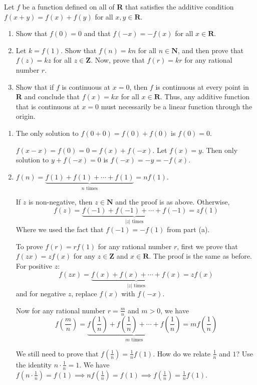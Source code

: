 \documentclass{oxmathproblems}
\begin{document}
\begin{questions}
\miquestion Let $f$ be a function defined on all of \textbf{R} that satisfies the additive condition $f(x+y) = f(x)+f(y)$ for all $x, y \in \textbf{R}$.
\begin{enumerate}[label=(\alph*)]
  \item Show that $f(0)=0$ and that $f(-x)=-f(x)$ for all $x \in \textbf{R}$.
  \item Let $k=f(1)$. Show that $f(n)=kn$ for all $n \in \textbf{N}$, and then prove that $f(z)=kz$ for all $z \in \textbf{Z}$. Now, prove that $f(r)=kr$ for any
  rational number $r$.
  \item Show that if $f$ is continuous at $x=0$, then $f$ is continuous at every point in \textbf{R} and conclude that $f(x)=kx$ for all $x \in \textbf{R}$. Thus,
  any additive function that is continuous at $x=0$ must necessarily be a linear function through the origin.
\end{enumerate}

\begin{solution}
  \begin{enumerate}[label=(\alph*)]
    \item The only solution to $f(0+0)=f(0)+f(0)$ is $f(0)=0$.
    
    $f(x-x)=f(0)=0=f(x)+f(-x)$. Let $f(x)=y$. Then only solution to $y+f(-x)=0$ is $f(-x)=-y=-f(x)$.

    \item $f(n) = \underbrace{f(1)+f(1)+ \cdots + f(1)}_{n \text{ times}} = nf(1)$.
    
    If $z$ is non-negative, then $z \in \textbf{N}$ and the proof is as above. Otherwise,
    \[f(z) = \underbrace{f(-1)+f(-1)+\cdots+f(-1)}_{|z| \text{ times}}=zf(1)\]
    Where we used the fact that $f(-1)=-f(1)$ from part (a).

    To prove $f(r) = rf(1)$ for any rational number $r$, first we prove that $f(zx)=zf(x)$ for any $z \in \textbf{Z}$ and $x \in \textbf{R}$. The proof is the same as before.
    For positive $z$:
    \[f(zx) = \underbrace{f(x)+f(x)+\cdots+f(x)}_{|z| \text{ times}}=zf(x)\]
    and for negative $z$, replace $f(x)$ with $f(-x)$.

    Now for any rational number $r=\frac{m}{n}$ and $m > 0$, we have
    \[f(\frac{m}{n}) = \underbrace{f(\frac{1}{n})+f(\frac{1}{n})+\cdots+f(\frac{1}{n})}_{m \text{ times}}=mf(\frac{1}{n})\]

    We still need to prove that $f(\frac{1}{n})=\frac{1}{n}f(1)$. How do we relate $\frac{1}{n}$ and $1$? Use the identity $n \cdot \frac{1}{n}=1$. We have
    $f(n \cdot \frac{1}{n})=f(1) \implies nf(\frac{1}{n})=f(1) \implies f(\frac{1}{n})=\frac{1}{n}f(1)$.


\end{enumerate}
\end{solution}
\end{questions}
\end{document}
